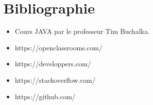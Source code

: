\documentclass[12pt,a4paper]{report}
\begin{document}
	\chapter*{Bibliographie}
	
	\vspace{2cm}
	  \begin{itemize}
	 		\item Cours JAVA par le professeur Tim Buchalka.
			\item https://openclassrooms.com/
			\item https://developpers.com/
			\item https://stackoverflow.com/
			\item https://github.com/
		\end{itemize}
	
\end{document}
